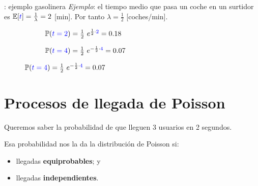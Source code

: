 \documentclass[xcolor={x11names}]{beamer}
\newcommand{\blue}[1]{{\color{blue}#1}}
\begin{document}
\begin{frame}{\secname: ejemplo gasolinera}
    \textit{Ejemplo}: el tiempo medio
    que pasa un coche en un surtidor es
    $\mathbb{E}[\blue{t}]=\tfrac{1}{\lambda}=2$ [min].
    Por tanto $\lambda=\tfrac{1}{2}$ [coches/min].

    \vfill


    \begin{figure}
     \centering
     \begin{subfigure}[b]{0.45\textwidth}
         \centering
         \resizebox{\textwidth}{!}{%
         }
         \caption{$\mathbb{P}(\blue{t=2})=\tfrac{1}{2}\ e^{\frac{1}{2}\cdot \blue{2}}=0.18$}
         \label{fig:y equals x}
     \end{subfigure}
     \hfill
     \begin{subfigure}[b]{0.45\textwidth}
         \centering
         \resizebox{\textwidth}{!}{%
         }
         \caption{$\mathbb{P}(\blue{t=4})=\tfrac{1}{2}\ e^{-\frac{1}{2}\cdot \blue{4}}=0.07$}
         \label{fig:three sin x}
     \end{subfigure}
    \end{figure}


\end{frame}




\section{Procesos de llegada de Poisson}



\begin{frame}{\secname}
    \begin{figure}
        
    \end{figure}

    Queremos saber la probabilidad de que
    lleguen 3 usuarios en 2 segundos.

    Esa probabilidad nos la da la distribución
    de Poisson si:
    \begin{itemize}
        \item llegadas \textbf{equiprobables}; y
        \item llegadas \textbf{independientes}.
    \end{itemize}
\end{frame}
\end{document}
